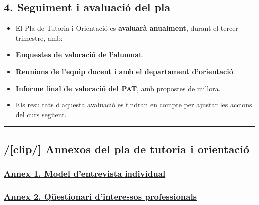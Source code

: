 \documentclass[
  paper=a4,
  ,captions=tableheading
]{scrartcl}
\providecommand{\tightlist}{%
  \setlength{\itemsep}{0pt}\setlength{\parskip}{0pt}}
\begin{document}
\hypertarget{seguiment-i-avaluaciuxf3-del-pla}{%
\subsection{4. Seguiment i avaluació del
pla}\label{seguiment-i-avaluaciuxf3-del-pla}}

\begin{itemize}
\tightlist
\item
  El Pla de Tutoria i Orientació es \textbf{avaluarà anualment}, durant
  el tercer trimestre, amb:
\item
  \textbf{Enquestes de valoració de l'alumnat}.
\item
  \textbf{Reunions de l'equip docent i amb el departament d'orientació}.
\item
  \textbf{Informe final de valoració del PAT}, amb propostes de millora.
\item
  Els resultats d'aquesta avaluació es tindran en compte per ajustar les
  accions del curs següent.
\end{itemize}

\begin{center}\rule{0.5\linewidth}{0.5pt}\end{center}

\hypertarget{clip-annexos-del-pla-de-tutoria-i-orientaciuxf3}{%
\subsection{/{[}clip/{]} Annexos del pla de tutoria i
orientació}\label{clip-annexos-del-pla-de-tutoria-i-orientaciuxf3}}

\hypertarget{annex-1.-model-dentrevista-individual}{%
\subsubsection{\texorpdfstring{\href{../annexos/Annex1-Entrevista/}{Annex
1. Model d'entrevista
individual}}{Annex 1. Model d'entrevista individual}}\label{annex-1.-model-dentrevista-individual}}

\hypertarget{annex-2.-quxfcestionari-dinteressos-professionals}{%
\subsubsection{\texorpdfstring{\href{../annexos/Annex2-Interessos/}{Annex
2. Qüestionari d'interessos
professionals}}{Annex 2. Qüestionari d'interessos professionals}}\label{annex-2.-quxfcestionari-dinteressos-professionals}}
\end{document}
